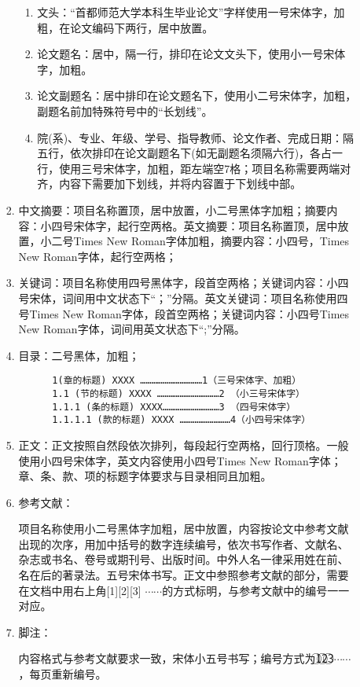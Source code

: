 \begin{itemize}[font=\cusong]
\begin{enumerate}
\begin{enumerate}[label=(\arabic* )]
\begin{enumerate}[label=\Roman* .]
\item 文头：“首都师范大学本科生毕业论文”字样使用一号宋体字，加粗，在论文编码下两行，居中放置。
\item 论文题名：居中，隔一行，排印在论文文头下，使用小一号宋体字，加粗。
\item 论文副题名：居中排印在论文题名下，使用小二号宋体字，加粗，副题名前加特殊符号中的“长划线”。
\item 院(系)、专业、年级、学号、指导教师、论文作者、完成日期：隔五行，依次排印在论文副题名下(如无副题名须隔六行)，各占一行，使用三号宋体字，加粗，距左端空7格；项目名称需要两端对齐，内容下需要加下划线，并将内容置于下划线中部。
		\end{enumerate}

		\item 中文摘要：项目名称置顶，居中放置，小二号黑体字加粗；摘要内容：小四号宋体字，起行空两格。英文摘要：项目名称置顶，居中放置，小二号Times New Roman字体加粗，摘要内容：小四号，Times New Roman字体，起行空两格；
		\item 关键词：项目名称使用四号黑体字，段首空两格；关键词内容：小四号宋体，词间用中文状态下“；”分隔。英文关键词：项目名称使用四号Times New Roman字体，段首空两格；关键词内容：小四号Times New Roman字体，词间用英文状态下“;”分隔。
		\item 目录：二号黑体，加粗；
		\begin{verbatim}
      1(章的标题) XXXX ……………………………1（三号宋体字、加粗）
      1.1 (节的标题) XXXX ……………………………2 （小三号宋体字）
      1.1.1 (条的标题) XXXX…………………………3 （四号宋体字）
      1.1.1.1 (款的标题) XXXX ………………………4（小四号宋体字）
		\end{verbatim}
		\item 正文：正文按照自然段依次排列，每段起行空两格，回行顶格。一般使用小四号宋体字，英文内容使用小四号Times New Roman字体；章、条、款、项的标题字体要求与目录相同且加粗。
		\item 参考文献： \par
项目名称使用小二号黑体字加粗，居中放置，内容按论文中参考文献出现的次序，用加中括号的数字连续编号，依次书写作者、文献名、杂志或书名、卷号或期刊号、出版时间。中外人名一律采用姓在前、名在后的著录法。五号宋体书写。正文中参照参考文献的部分，需要在文档中用右上角[1][2][3] $\cdots\cdots$的方式标明，与参考文献中的编号一一对应。
		\item 脚注：\par
内容格式与参考文献要求一致，宋体小五号书写；编号方式为\textcircled{1}\textcircled{2}\textcircled{3}$\cdots\cdots$，每页重新编号。
	\end{enumerate}

\end{enumerate}
\end{itemize}
